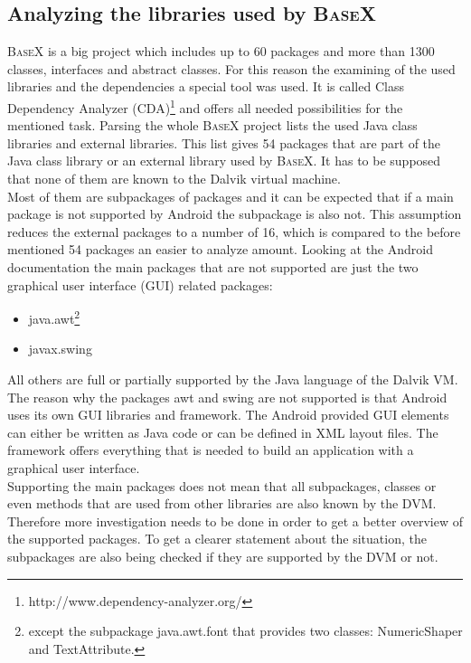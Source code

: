 \subsection{Analyzing the libraries used by \textsc{BaseX}}
\label{sec:migration:analyzing-the-libraries-used-by-basex}
\textsc{BaseX} is a big project which includes up to 60 packages and more than 1300 classes, interfaces and abstract classes.
For this reason the examining of the used libraries and the dependencies a special tool was used.
It is called Class Dependency Analyzer (CDA)\footnote{http://www.dependency-analyzer.org/} and offers all needed possibilities for the mentioned task.
Parsing the whole \textsc{BaseX} project lists the used Java class libraries and external libraries.
This list gives 54 packages that are part of the Java class library or an external library used by \textsc{BaseX}.
It has to be supposed that none of them are known to the Dalvik virtual machine.\\
Most of them are subpackages of packages and it can be expected that if a main package is not supported by Android the subpackage is also not. 
This assumption reduces the external packages to a number of 16, which is compared to the before mentioned 54 packages an easier to analyze amount.
Looking at the Android documentation the main packages that are not supported are just the two graphical user interface (GUI) related packages:
\begin{itemize}
  \item java.awt\footnote{except the subpackage java.awt.font that provides two classes: NumericShaper and TextAttribute.}
  \item javax.swing
\end{itemize}
All others are full or partially supported by the Java language of the Dalvik VM.
The reason why the packages awt and swing are not supported is that Android uses its own GUI libraries and framework.
The Android provided GUI elements can either be written as Java code or can be defined in XML layout files.
The framework offers everything that is needed to build an application with a graphical user interface.\\
Supporting the main packages does not mean that all subpackages, classes or even methods that are used from other libraries are also known by the DVM.
Therefore more investigation needs to be done in order to get a better overview of the supported packages.
To get a clearer statement about the situation, the subpackages are also being checked if they are supported by the DVM or not.
